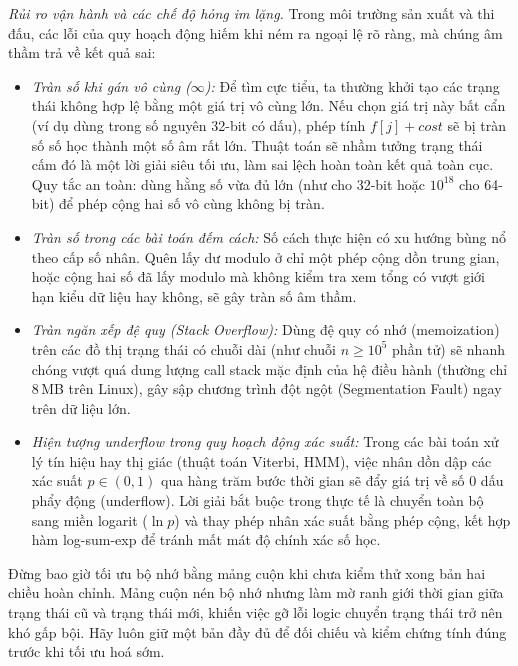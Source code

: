 \documentclass[../../algorithm.tex]{subfiles}
\begin{document}
\emph{Rủi ro vận hành và các chế độ hỏng im lặng.} Trong môi trường sản xuất và thi đấu, các lỗi của quy hoạch động hiếm khi ném ra ngoại lệ rõ ràng, mà chúng âm thầm trả về kết quả sai:
\begin{itemize}
\item \emph{Tràn số khi gán vô cùng (\(\infty\)):} Để tìm cực tiểu, ta thường khởi tạo các trạng thái không hợp lệ bằng một giá trị vô cùng lớn. Nếu chọn giá trị này bất cẩn (ví dụ dùng  trong số nguyên 32-bit có dấu), phép tính \(f[j] + cost\) sẽ bị tràn số số học thành một số âm rất lớn. Thuật toán sẽ nhầm tưởng trạng thái cấm đó là một lời giải siêu tối ưu, làm sai lệch hoàn toàn kết quả toàn cục. Quy tắc an toàn: dùng hằng số vừa đủ lớn (như  cho 32-bit hoặc \(10^{18}\) cho 64-bit) để phép cộng hai số vô cùng không bị tràn.
\item \emph{Tràn số trong các bài toán đếm cách:} Số cách thực hiện có xu hướng bùng nổ theo cấp số nhân. Quên lấy dư modulo ở chỉ một phép cộng dồn trung gian, hoặc cộng hai số đã lấy modulo mà không kiểm tra xem tổng có vượt giới hạn kiểu dữ liệu hay không, sẽ gây tràn số âm thầm.
\item \emph{Tràn ngăn xếp đệ quy (Stack Overflow):} Dùng đệ quy có nhớ (memoization) trên các đồ thị trạng thái có chuỗi dài (như chuỗi \(n \ge 10^5\) phần tử) sẽ nhanh chóng vượt quá dung lượng call stack mặc định của hệ điều hành (thường chỉ 8\,MB trên Linux), gây sập chương trình đột ngột (Segmentation Fault) ngay trên dữ liệu lớn.
\item \emph{Hiện tượng underflow trong quy hoạch động xác suất:} Trong các bài toán xử lý tín hiệu hay thị giác (thuật toán Viterbi, HMM), việc nhân dồn dập các xác suất \(p \in (0, 1)\) qua hàng trăm bước thời gian sẽ đẩy giá trị về số 0 dấu phẩy động (underflow). Lời giải bắt buộc trong thực tế là chuyển toàn bộ sang miền logarit (\(\ln p\)) và thay phép nhân xác suất bằng phép cộng, kết hợp hàm log-sum-exp để tránh mất mát độ chính xác số học.
\end{itemize}

\begin{cambay}
Đừng bao giờ tối ưu bộ nhớ bằng mảng cuộn khi chưa kiểm thử xong bản hai chiều hoàn chỉnh. Mảng cuộn nén bộ nhớ nhưng làm mờ ranh giới thời gian giữa trạng thái cũ và trạng thái mới, khiến việc gỡ lỗi logic chuyển trạng thái trở nên khó gấp bội. Hãy luôn giữ một bản đầy đủ để đối chiếu và kiểm chứng tính đúng trước khi tối ưu hoá sớm.
\end{cambay}
\end{document}
